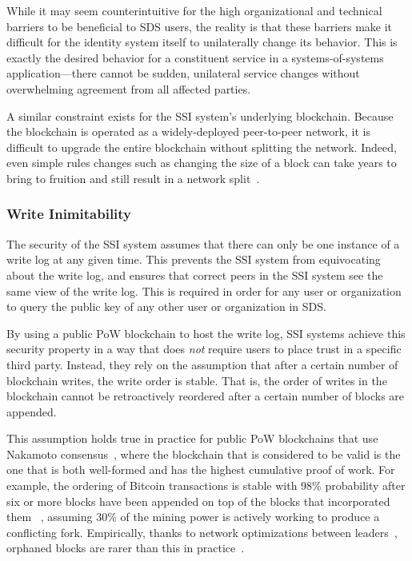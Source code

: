 While it may seem counterintuitive for the high organizational and technical
barriers to be beneficial to SDS users, the reality is that these barriers
make it difficult for the identity system itself to unilaterally change its
behavior.  This is exactly the desired behavior for a constituent service in a
systems-of-systems application---there cannot be sudden,
unilateral service changes without overwhelming agreement from all affected parties.

A similar constraint exists for the SSI system's underlying blockchain.
Because the blockchain is operated as a widely-deployed peer-to-peer network,
it is difficult to upgrade the entire blockchain without splitting the network.
Indeed, even simple rules changes such as changing the size of a block can take 
years to bring to fruition and still result in a network
split~\cite{bitcoin-cash-split}.

\subsubsection{Write Inimitability}

The security of the SSI system assumes that there can only be one instance of a write
log at any given time.  This prevents the SSI system from equivocating about the write log, and
ensures that correct peers in the SSI system see the same view of the write log.  This
is required in order for any user or organization to query the public key of any other 
user or organization in SDS.

By using a public PoW blockchain to host the write log, SSI systems achieve
this security property in a way that does \emph{not} require users to place
trust in a specific third party.  Instead, they rely on the assumption that after a certain number
of blockchain writes, the write order is stable.  That is, the order of writes
in the blockchain cannot be retroactively reordered after a certain number of
blocks are appended.

This assumption holds true in practice for public PoW blockchains that use
Nakamoto consensus~\cite{bitcoin-pedigree}, where the blockchain that is
considered to be valid is the one that is both well-formed and has the highest
cumulative proof of work.  For example, the ordering of Bitcoin transactions
is stable with 98\% probability after six or more blocks have been appended on top of
the blocks that incorporated them
~\cite{bitcoin}, assuming 30\% of the mining power is actively working to
produce a conflicting fork.
Empirically, thanks to network optimizations between leaders~\cite{bitcoin-miner-network},
orphaned blocks are rarer than this in practice~\cite{blockchain-info-orphan-rate}.

